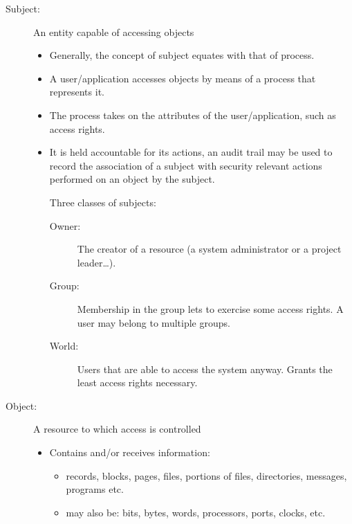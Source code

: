 \documentclass{article}
\begin{document}
                \begin{description}
                    \item[Subject:] An entity
                    capable of
                    accessing
                    objects
                    \begin{itemize}
                        \item Generally, the concept of subject equates with that of process.
                        \item A user/application accesses objects by means of a process that represents it.
                        \item The process takes on the attributes of the user/application, such as access rights.
                        \item It is held accountable for its actions, an audit trail may be used to record the association of a subject with security relevant actions performed on an object by the subject.
                        \item[Three classes of subjects:]
                        \begin{description}
                            \item[Owner:] The creator of a resource (a system administrator or a project leader…).
                            \item[Group:] Membership in the group lets to exercise some access rights. A user may belong to multiple groups.
                            \item[World:] Users that are able to access the system anyway. Grants the least access rights necessary.
                        \end{description}
                    \end{itemize}
                    \item[Object:] A resource to
                    which access is
                    controlled
                    \begin{itemize}
                        \item Contains and/or receives information:
                        \begin{itemize}
                            \item records, blocks, pages, files, portions of files, directories, messages, programs etc.
                            \item may also be: bits, bytes, words, processors, ports, clocks, etc.
                        \end{itemize}

\end{itemize}
\end{description}
\end{document}
